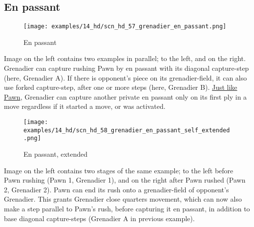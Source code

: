 \clearpage %

\subsection*{En passant}
\label{sec:Hemera's Dawn/Grenadier/En passant}

\vspace*{-1.1\baselineskip}
\noindent
\begin{wrapfigure}[15]{l}{0.4\textwidth}
\centering
\texttt{[image: examples/14\_hd/scn\_hd\_57\_grenadier\_en\_passant.png]}
\vspace*{-1.4\baselineskip}
\caption{En passant}
\label{fig:scn_hd_57_grenadier_en_passant}
\end{wrapfigure}
Image on the left contains two examples in parallel; to the left, and on the right.\newline
\indent
Grenadier can capture rushing Pawn by en passant with its diagonal capture-step (here,
Grenadier A). If there is opponent's piece on its grenadier-field, it can also use
forked capture-step, after one or more steps (here, Grenadier B).\newline
\indent
\hyperref[fig:scn_mv_097_en_passant_illegal_init]{Just like Pawn},
Grenadier can capture another private en passant only on its first ply in a move
regardless if it started a move, or was activated.

\vspace*{-0.7\baselineskip}
\noindent
\begin{wrapfigure}[15]{l}{0.4\textwidth}
\centering
\texttt{[image: examples/14\_hd/scn\_hd\_58\_grenadier\_en\_passant\_self\_extended.png]}
\vspace*{-1.4\baselineskip}
\caption{En passant, extended}
\label{fig:scn_hd_58_grenadier_en_passant_self_extended}
\end{wrapfigure}
Image on the left contains two stages of the same example; to the left before Pawn
rushing (Pawn 1, Grenadier 1), and on the right after Pawn rushed (Pawn 2, Grenadier
2).\newline
\indent
Pawn can end its rush onto a grenadier-field of opponent's Grenadier. This grants
Grenadier close quarters movement, which can now also make a step parallel to Pawn's
rush, before capturing it en passant, in addition to base diagonal capture-steps
(Grenadier A in previous example).

